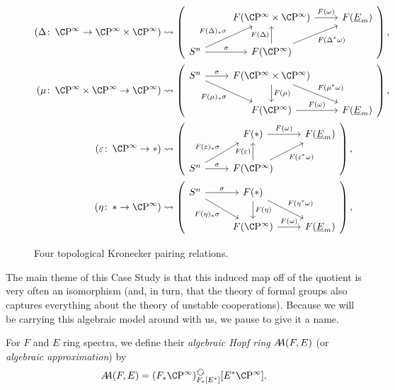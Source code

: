 \begin{figure}
\begin{align*}
(\Delta\co \CP^\infty \to \CP^\infty \times \CP^\infty) & \leadsto
\left(
\begin{tikzcd}[ampersand replacement=\&]
\& F(\CP^\infty \times \CP^\infty) \arrow["F(\omega)"]{r} \& F(\OS{E}{m}) \\
S^n \arrow["\sigma"]{r} \arrow["F(\Delta)_* \sigma"]{ru} \& F(\CP^\infty) \arrow["F(\Delta)"]{u} \arrow["F(\Delta^* \omega)"']{ru}
\end{tikzcd}
\right), \\
(\mu\co \CP^\infty \times \CP^\infty \to \CP^\infty) & \leadsto
\left(
\begin{tikzcd}[ampersand replacement=\&]
S^n \arrow["\sigma"]{r} \arrow["F(\mu)_* \sigma"']{rd} \& F(\CP^\infty \times \CP^\infty) \arrow["F(\mu)"]{d} \arrow["F(\mu^* \omega)"]{rd} \\
\& F(\CP^\infty) \arrow["F(\omega)"]{r} \& F(\OS{E}{m})
\end{tikzcd}
\right), \\
(\eps\co \CP^\infty \to *) & \leadsto
\left(
\begin{tikzcd}[ampersand replacement=\&]
\& F(*) \arrow["F(\omega)"]{r} \& F(\OS{E}{m}) \\
S^n \arrow["\sigma"]{r} \arrow["F(\eps)_* \sigma"]{ru} \& F(\CP^\infty) \arrow["F(\eps)"]{u} \arrow["F(\eps^* \omega)"']{ru}
\end{tikzcd}
\right), \\
(\eta\co * \to \CP^\infty) & \leadsto
\left(
\begin{tikzcd}[ampersand replacement=\&]
S^n \arrow["\sigma"]{r} \arrow["F(\eta)_* \sigma"']{rd} \& F(*) \arrow["F(\eta)"]{d} \arrow["F(\eta^* \omega)"]{rd} \\
\& F(\CP^\infty) \arrow["F(\omega)"]{r} \& F(\OS{E}{m})
\end{tikzcd}
\right),
\end{align*}
\caption{Four topological Kronecker pairing relations.}\label{KroneckerPairingFigure}
\end{figure}

The main theme of this Case Study is that this induced map off of the quotient is very often an isomorphism (and, in turn, that the theory of formal groups also captures everything about the theory of unstable cooperations).  Because we will be carrying this algebraic model around with us, we pause to give it a name.

\begin{definition}
For \(F\) and \(E\) ring spectra, we define their \textit{algebraic Hopf ring} \(\AA(F, E)\) (or \textit{algebraic approximation}) by \[\AA(F, E) = (F_* \CP^\infty)_{F_*[E^*]}^{\circulatearrows}[E^* \CP^\infty].\]
\end{definition}

